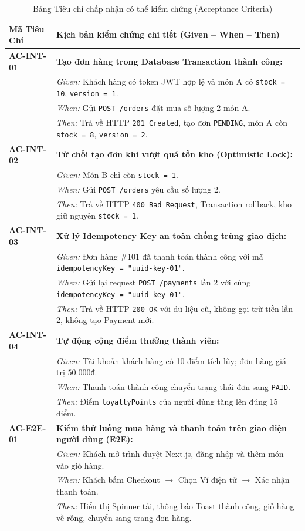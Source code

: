 \documentclass[12pt,a4paper]{article}
\begin{document}
\begin{table}[H]
\centering
\small
\begin{tabularx}{\textwidth}{>{\bfseries}l >{\raggedright\arraybackslash}X}
\toprule
\rowcolor{tableheader}
Mã Tiêu Chí & Kịch bản kiểm chứng chi tiết (Given -- When -- Then) \\
\midrule
AC-INT-01 & \textbf{Tạo đơn hàng trong Database Transaction thành công:}\\
& \textit{Given:} Khách hàng có token JWT hợp lệ và món A có \texttt{stock = 10}, \texttt{version = 1}.\\
& \textit{When:} Gửi \texttt{POST /orders} đặt mua số lượng 2 món A.\\
& \textit{Then:} Trả về HTTP \texttt{201 Created}, tạo đơn \texttt{PENDING}, món A còn \texttt{stock = 8}, \texttt{version = 2}.\\
\addlinespace
AC-INT-02 & \textbf{Từ chối tạo đơn khi vượt quá tồn kho (Optimistic Lock):}\\
& \textit{Given:} Món B chỉ còn \texttt{stock = 1}.\\
& \textit{When:} Gửi \texttt{POST /orders} yêu cầu số lượng 2.\\
& \textit{Then:} Trả về HTTP \texttt{400 Bad Request}, Transaction rollback, kho giữ nguyên \texttt{stock = 1}.\\
\addlinespace
AC-INT-03 & \textbf{Xử lý Idempotency Key an toàn chống trùng giao dịch:}\\
& \textit{Given:} Đơn hàng \#101 đã thanh toán thành công với mã \texttt{idempotencyKey = "uuid-key-01"}.\\
& \textit{When:} Gửi lại request \texttt{POST /payments} lần 2 với cùng \texttt{idempotencyKey = "uuid-key-01"}.\\
& \textit{Then:} Trả về HTTP \texttt{200 OK} với dữ liệu cũ, không gọi trừ tiền lần 2, không tạo Payment mới.\\
\addlinespace
AC-INT-04 & \textbf{Tự động cộng điểm thưởng thành viên:}\\
& \textit{Given:} Tài khoản khách hàng có 10 điểm tích lũy; đơn hàng giá trị $50.000\text{đ}$.\\
& \textit{When:} Thanh toán thành công chuyển trạng thái đơn sang \texttt{PAID}.\\
& \textit{Then:} Điểm \texttt{loyaltyPoints} của người dùng tăng lên đúng 15 điểm.\\
\addlinespace
AC-E2E-01 & \textbf{Kiểm thử luồng mua hàng và thanh toán trên giao diện người dùng (E2E):}\\
& \textit{Given:} Khách mở trình duyệt Next.js, đăng nhập và thêm món vào giỏ hàng.\\
& \textit{When:} Khách bấm Checkout $\rightarrow$ Chọn Ví điện tử $\rightarrow$ Xác nhận thanh toán.\\
& \textit{Then:} Hiển thị Spinner tải, thông báo Toast thành công, giỏ hàng về rỗng, chuyển sang trang đơn hàng.\\
\bottomrule
\end{tabularx}
\caption{Bảng Tiêu chí chấp nhận có thể kiểm chứng (Acceptance Criteria)}
\end{table}
\end{document}
